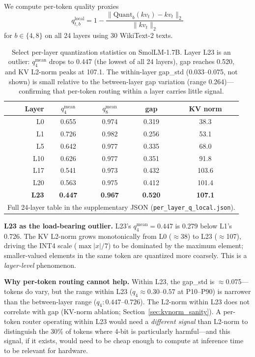 \documentclass{article}
\begin{document}
We compute per-token quality proxies
\[
q_{t,b}^\text{local} = 1 - \frac{\|\text{Quant}_b(kv_t) - kv_t\|_2}{\|kv_t\|_2}
\]
for $b\in\{4,8\}$ on all 24 layers using 30 WikiText-2 texts.

\begin{table}[h]
\centering
\caption{Select per-layer quantization statistics on SmolLM-1.7B. Layer L23 is an outlier:
$q_4^\text{mean}$ drops to 0.447 (the lowest of all 24 layers), gap reaches 0.520, and
KV L2-norm peaks at 107.1. The within-layer gap\_std (0.033--0.075, not shown) is small
relative to the between-layer gap variation (range 0.264)---confirming that per-token
routing within a layer carries little signal.}
\begin{tabular}{rcccc}
\toprule
Layer & $q_4^\text{mean}$ & $q_8^\text{mean}$ & gap & KV norm \\
\midrule
L0  & 0.655 & 0.974 & 0.319 &  38.3 \\
L1  & 0.726 & 0.982 & 0.256 &  53.1 \\
L5  & 0.642 & 0.977 & 0.335 &  68.0 \\
L10 & 0.626 & 0.977 & 0.351 &  91.8 \\
L17 & 0.541 & 0.973 & 0.432 & 103.6 \\
L20 & 0.563 & 0.975 & 0.412 & 101.4 \\
\textbf{L23} & \textbf{0.447} & \textbf{0.967} & \textbf{0.520} & \textbf{107.1} \\
\midrule
\multicolumn{5}{l}{\small Full 24-layer table in the supplementary JSON (\texttt{per\_layer\_q\_local.json}).} \\
\bottomrule
\end{tabular}
\label{tab:perlayer}
\end{table}

\textbf{L23 as the load-bearing outlier.} L23's $q_4^\text{mean}{=}0.447$ is 0.279 below L1's
0.726. The KV L2-norm grows monotonically from L0 ($\approx$38) to L23 ($\approx$107), driving
the INT4 scale ($\max|x|/7$) to be dominated by the maximum element; smaller-valued elements
in the same token are quantized more coarsely. This is a \emph{layer-level} phenomenon.

\textbf{Why per-token routing cannot help.} Within L23, the gap\_std is $\approx$0.075---tokens
do vary, but the range within L23 ($q_4\approx0.30$--$0.57$ at P10--P90) is narrower than the
between-layer range ($q_4: 0.447$--$0.726$). The L2-norm within L23 does not correlate with
gap (KV-norm ablation; Section~\ref{sec:kvnorm_sanity}). A per-token router operating within
L23 would need a \emph{different signal} than L2-norm to distinguish the 30\% of tokens where
4-bit is particularly harmful---and this signal, if it exists, would need to be cheap enough
to compute at inference time to be relevant for hardware.
\end{document}
